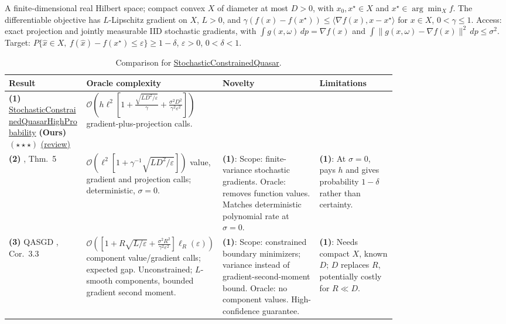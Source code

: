\begin{table}[tp]
\centering
\caption{Comparison for \href{https://github.com/k3nfalt/longtails/blob/main/LongTails/Setups/StochasticConstrainedQuasar.lean}{StochasticConstrainedQuasar}.}\label{tab:StochasticConstrainedQuasar}
\parbox{\linewidth}{\footnotesize A finite-dimensional real Hilbert space; compact convex $X$ of diameter at most $D>0$, with $x_0,x^\star\in X$ and $x^\star\in\arg\min_X f$. The differentiable objective has $L$-Lipschitz gradient on $X$, $L>0$, and $\gamma(f(x)-f(x^\star))\le\langle\nabla f(x),x-x^\star\rangle$ for $x\in X$, $0<\gamma\le1$. Access: exact projection and jointly measurable IID stochastic gradients, with $\int g(x,\omega)\,dp=\nabla f(x)$ and $\int\|g(x,\omega)-\nabla f(x)\|^2\,dp\le\sigma^2$. Target: $P\{\widehat x\in X,\ f(\widehat x)-f(x^\star)\le\varepsilon\}\ge1-\delta$, $\varepsilon>0$, $0<\delta<1$.}\par\smallskip
\begin{threeparttable}
\footnotesize
\setlength{\tabcolsep}{4pt}\renewcommand{\arraystretch}{1.25}
\begin{tabularx}{\linewidth}{@{}>{\raggedright\arraybackslash}p{0.20\linewidth}>{\raggedright\arraybackslash}p{0.32\linewidth}>{\raggedright\arraybackslash}p{0.25\linewidth}>{\raggedright\arraybackslash}X@{}}
\toprule
\textbf{Result} & \textbf{Oracle complexity} & \textbf{Novelty} & \textbf{Limitations} \\
\midrule
\textbf{(1)} \href{https://github.com/k3nfalt/longtails/blob/main/LongTails/Theorems/StochasticConstrainedQuasarHighProbability.lean}{Stochastic\allowbreak Constrained\allowbreak Quasar\allowbreak High\allowbreak Probability} \textbf{(Ours)} $(\star\star\star)$ \href{https://github.com/k3nfalt/longtails/blob/main/scripts/reviews/StochasticConstrainedQuasarHighProbability.md}{(review)} & $\mathcal{O}\!\left(h\ell^2\left[1+\frac{\sqrt{LD^2/\varepsilon}}{\gamma}+\frac{\sigma^2D^2}{\gamma^2\varepsilon^2}\right]\right)$ gradient-plus-projection calls. & & \\
\midrule[1.2pt]
\textbf{(2)} \citep{scqMartinez2026}, Thm.~5 & $\mathcal{O}\!\left(\ell^2[1+\gamma^{-1}\sqrt{LD^2/\varepsilon}]\right)$ value, gradient and projection calls; deterministic, $\sigma=0$. & \textbf{(1)}: Scope: finite-variance stochastic gradients. Oracle: removes function values. Matches deterministic polynomial rate at $\sigma=0$. & \textbf{(1)}: At $\sigma=0$, pays $h$ and gives probability $1-\delta$ rather than certainty. \\
\midrule
\textbf{(3)} QASGD \citep{scqFu2023}, Cor.~3.3 & $\mathcal{O}\!\left([1+R\sqrt{L/\varepsilon}+\frac{\sigma^2R^2}{\gamma^2\varepsilon^2}]\ell_R(\varepsilon)\right)$ component value/gradient calls; expected gap. Unconstrained; $L$-smooth components, bounded gradient second moment. & \textbf{(1)}: Scope: constrained boundary minimizers; variance instead of gradient-second-moment bound. Oracle: no component values. High-confidence guarantee. & \textbf{(1)}: Needs compact $X$, known $D$; $D$ replaces $R$, potentially costly for $R\ll D$. \\

\end{tabularx}
\end{threeparttable}
\end{table}
